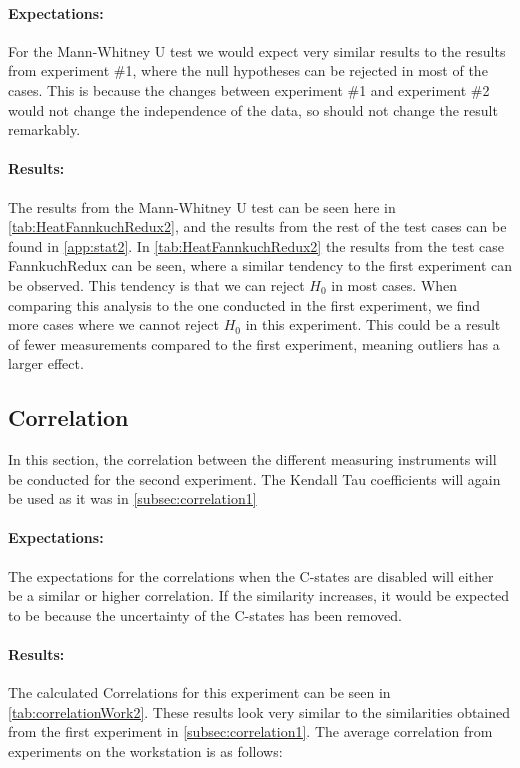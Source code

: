 \paragraph{Expectations:} For the Mann-Whitney U test we would expect very similar results to the results from experiment \#1, where the null hypotheses can be rejected in most of the cases. This is because the changes between experiment \#1 and experiment \#2 would not change the independence of the data, so should not change the result remarkably.



\paragraph{Results:} The results from the Mann-Whitney U test can be seen here in \cref{tab:HeatFannkuchRedux2}, and the results from the rest of the test cases can be found in \cref{app:stat2}. In \cref{tab:HeatFannkuchRedux2} the results from the test case FannkuchRedux can be seen, where a similar tendency to the first experiment can be observed. This tendency is that we can reject $H_0$ in most cases. When comparing this analysis to the one conducted in the first experiment, we find more cases where we cannot reject $H_0$ in this experiment. This could be a result of fewer measurements compared to the first experiment, meaning outliers has a larger effect.

\subsection{Correlation}\label{subsec:correlation2}
In this section, the correlation between the different measuring instruments will be conducted for the second experiment. The Kendall Tau coefficients\cite{kendall1938new} will again be used as it was in \cref{subsec:correlation1}

\paragraph{Expectations:} The expectations for the correlations when the C-states are disabled will either be a similar or higher correlation. If the similarity increases, it would be expected to be because the uncertainty of the C-states has been removed.



\paragraph{Results:} The calculated Correlations for this experiment can be seen in \cref{tab:correlationWork2}. These results look very similar to the similarities obtained from the first experiment in \cref{subsec:correlation1}. The average correlation from experiments on the workstation is as follows:

